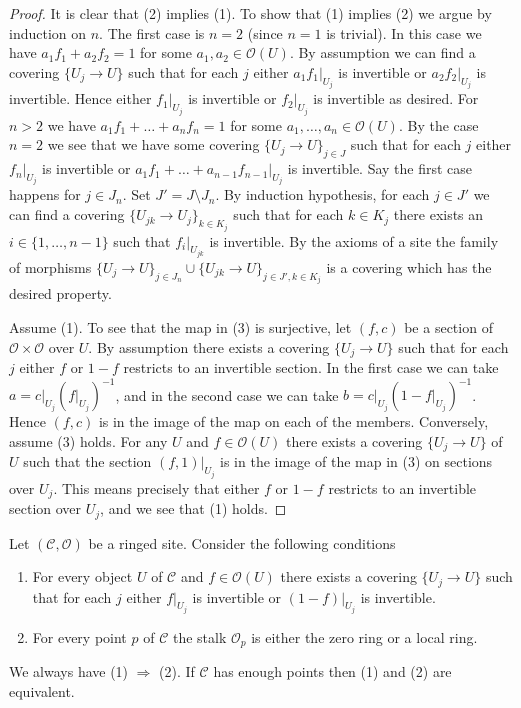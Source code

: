 \begin{proof}
It is clear that (2) implies (1). To show that (1) implies (2) we argue by
induction on $n$. The first case is $n = 2$ (since $n = 1$ is trivial).
In this case we have $a_1f_1 + a_2f_2 = 1$ for some
$a_1, a_2 \in \mathcal{O}(U)$. By assumption we can find a covering
$\{U_j \to U\}$ such that for each $j$
either $a_1f_1|_{U_j}$ is invertible or $a_2f_2|_{U_j}$ is invertible.
Hence either $f_1|_{U_j}$ is invertible or $f_2|_{U_j}$ is invertible
as desired. For $n > 2$ we have
$a_1f_1 + \ldots + a_nf_n = 1$ for some $a_1, \ldots, a_n \in \mathcal{O}(U)$.
By the case $n = 2$ we see that we have some covering $\{U_j \to U\}_{j \in J}$
such that for each $j$ either $f_n|_{U_j}$ is invertible or
$a_1f_1 + \ldots + a_{n - 1}f_{n - 1}|_{U_j}$ is invertible.
Say the first case happens for $j \in J_n$. Set $J' = J \setminus J_n$.
By induction hypothesis, for each $j \in J'$ we can find a covering
$\{U_{jk} \to U_j\}_{k \in K_j}$ such that for each $k \in K_j$ there
exists an $i \in \{1, \ldots, n - 1\}$ such that
$f_i|_{U_{jk}}$ is invertible. By the axioms of a site the family of
morphisms
$\{U_j \to U\}_{j \in J_n} \cup \{U_{jk} \to U\}_{j \in J', k \in K_j}$
is a covering which has the desired property.

\medskip\noindent
Assume (1). To see that the map in (3) is surjective, let
$(f, c)$ be a section of $\mathcal{O} \times \mathcal{O}$ over $U$.
By assumption there exists a covering $\{U_j \to U\}$ such that
for each $j$ either $f$ or $1 - f$ restricts to an invertible section.
In the first case we can take $a = c|_{U_j} (f|_{U_j})^{-1}$, and
in the second case we can take $b = c|_{U_j} (1 - f|_{U_j})^{-1}$.
Hence $(f, c)$ is in the image of the map on each of the members.
Conversely, assume (3) holds. For any $U$ and $f \in \mathcal{O}(U)$
there exists a covering $\{U_j \to U\}$ of $U$ such that the
section $(f, 1)|_{U_j}$ is in the image of the map in (3) on sections
over $U_j$. This means precisely that either $f$ or $1 - f$ restricts
to an invertible section over $U_j$, and we see that (1) holds.
\end{proof}

\begin{lemma}
\label{lemma-locally-ringed-stalk}
Let $(\mathcal{C}, \mathcal{O})$ be a ringed site.
Consider the following conditions
\begin{enumerate}
\item For every object $U$ of $\mathcal{C}$ and $f \in \mathcal{O}(U)$
there exists a covering $\{U_j \to U\}$ such that for each $j$
either $f|_{U_j}$ is invertible or $(1 - f)|_{U_j}$ is invertible.
\item For every point $p$ of $\mathcal{C}$ the stalk $\mathcal{O}_p$
is either the zero ring or a local ring.
\end{enumerate}
We always have (1) $\Rightarrow$ (2). If $\mathcal{C}$ has enough points
then (1) and (2) are equivalent.
\end{lemma}

